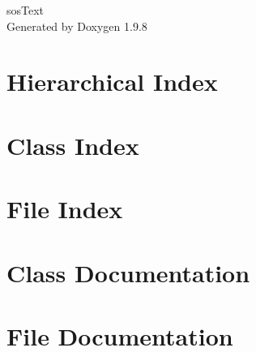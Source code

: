 \documentclass[twoside]{book}
\newcommand{\+}{\discretionary{\mbox{\scriptsize$\hookleftarrow$}}{}{}}
\newcommand{\clearemptydoublepage}{%
    \newpage{\pagestyle{empty}\cleardoublepage}%
  }
\begin{document}
  \raggedbottom
    \hypersetup{pageanchor=false,
                bookmarksnumbered=true,
                pdfencoding=unicode
               }
  \begin{titlepage}
  \vspace*{7cm}
  \begin{center}%
  {\Large sos\+Text}\\
  \vspace*{1cm}
  {\large Generated by Doxygen 1.9.8}\\
  \end{center}
  \end{titlepage}
  \clearemptydoublepage
  \tableofcontents
  \clearemptydoublepage
  \hypersetup{pageanchor=true}
\chapter{Hierarchical Index}

\chapter{Class Index}

\chapter{File Index}

\chapter{Class Documentation}










\chapter{File Documentation}



















  \backmatter
  \newpage
  \clearemptydoublepage
  \printindex
\end{document}

